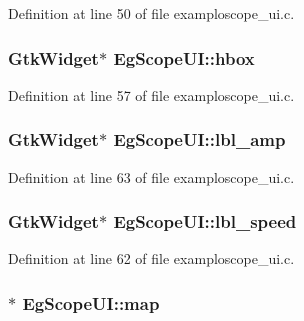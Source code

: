 Definition at line 50 of file examploscope\+\_\+ui.\+c.

\subsubsection[{\texorpdfstring{hbox}{hbox}}]{\setlength{\rightskip}{0pt plus 5cm}Gtk\+Widget$\ast$ Eg\+Scope\+U\+I\+::hbox}\hypertarget{struct_eg_scope_u_i_af374e694ac004b0124516e9f494a1563}{}\label{struct_eg_scope_u_i_af374e694ac004b0124516e9f494a1563}


Definition at line 57 of file examploscope\+\_\+ui.\+c.

\subsubsection[{\texorpdfstring{lbl\+\_\+amp}{lbl_amp}}]{\setlength{\rightskip}{0pt plus 5cm}Gtk\+Widget$\ast$ Eg\+Scope\+U\+I\+::lbl\+\_\+amp}\hypertarget{struct_eg_scope_u_i_a2b0f9e0f1e8025a27a2111c93cc7a5f7}{}\label{struct_eg_scope_u_i_a2b0f9e0f1e8025a27a2111c93cc7a5f7}


Definition at line 63 of file examploscope\+\_\+ui.\+c.

\subsubsection[{\texorpdfstring{lbl\+\_\+speed}{lbl_speed}}]{\setlength{\rightskip}{0pt plus 5cm}Gtk\+Widget$\ast$ Eg\+Scope\+U\+I\+::lbl\+\_\+speed}\hypertarget{struct_eg_scope_u_i_ab60272091a3aef032244a62129664b9c}{}\label{struct_eg_scope_u_i_ab60272091a3aef032244a62129664b9c}


Definition at line 62 of file examploscope\+\_\+ui.\+c.

\subsubsection[{\texorpdfstring{map}{map}}]{$\ast$ Eg\+Scope\+U\+I\+::map}\hypertarget{struct_eg_scope_u_i_ab1483761a25285a31b0800a873eeca7b}{}\label{struct_eg_scope_u_i_ab1483761a25285a31b0800a873eeca7b}


